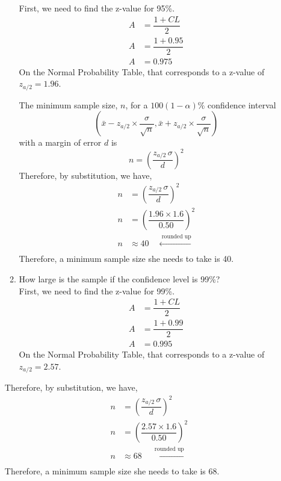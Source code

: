 \documentclass[12pt]{book}
\begin{document}
\begin{enumerate}
\begin{enumerate}
        First, we need to find the z-value for 95\%.
        \begin{align*}
            A &= \dfrac{1+CL}{2}\\
            A &= \dfrac{1+0.95}{2}\\
            A &= 0.975
        \end{align*}
        On the Normal Probability Table, that corresponds to a z-value of $z_{a/2} = 1.96$.
        
        The minimum sample size, $n$, for a $100(1 - \alpha)\%$ confidence interval
        $$\left(\bar{x} - z_{a/2} \times \dfrac{\sigma}{\sqrt{n}} , \bar{x} + z_{a/2} \times \dfrac{\sigma}{\sqrt{n}}\right)$$
        with a margin of error $d$ is $$n = \left( \dfrac{z_{a/2} \, \sigma}{d} \right)^2$$
        Therefore, by substitution, we have,
        \begin{align*}
            n &= \left( \dfrac{z_{a/2} \, \sigma}{d} \right)^2\\
            n &= \left( \dfrac{1.96 \times 1.6}{0.50} \right)^2\\
            n &\approx 40 \quad \xleftarrow[]{\text{ rounded up}}
        \end{align*}
        Therefore, a minimum sample size she needs to take is 40.\\
        
        \item How large is the sample if the confidence level is 99\%?\\
        
        First, we need to find the z-value for 99\%.
        \begin{align*}
            A &= \dfrac{1+CL}{2}\\
            A &= \dfrac{1+0.99}{2}\\
            A &= 0.995
        \end{align*}
        On the Normal Probability Table, that corresponds to a z-value of $z_{a/2} = 2.57$.
    \end{enumerate}
    Therefore, by substitution, we have,
        \begin{align*}
            n &= \left( \dfrac{z_{a/2} \, \sigma}{d} \right)^2\\
            n &= \left( \dfrac{2.57 \times 1.6}{0.50} \right)^2\\
            n &\approx 68 \quad \xleftarrow[]{\text{ rounded up}}
        \end{align*}
        Therefore, a minimum sample size she needs to take is 68.
    

\end{enumerate}
\end{document}
